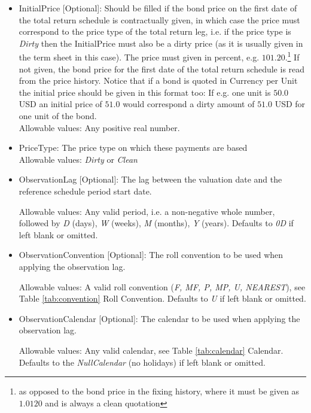 \begin{itemize}
\begin{itemize}
  \item InitialPrice [Optional]: Should be filled if the bond price on the first date of the total return schedule is
    contractually given, in which case the price must correspond to the price type of the total return leg, i.e. if the
    price type is \emph{Dirty} then the InitialPrice must also be a dirty price (as it is usually given in the term
    sheet in this case). The price must given in percent, e.g. $101.20$.\footnote{as opposed to the bond price in the
    fixing history, where it must be given as $1.0120$ and is always a clean quotation} If not given, the bond price for
    the first date of the total return schedule is read from the price history.  Notice that if a bond is quoted in
    Currency per Unit the initial price should be given in this format too: If e.g. one unit is $50.0$ USD an initial
    price of $51.0$ would correspond a dirty amount of $51.0$ USD for one unit of the bond.\\

    Allowable values: Any positive real number.

  \item PriceType: The price type on which these payments are based\\
    Allowable values: \emph{Dirty} or \emph{Clean}

  \item ObservationLag [Optional]: The lag between the valuation date and the reference schedule period start date.
  
    Allowable values: Any valid period, i.e. a non-negative whole number, followed by \emph{D} (days), \emph{W} (weeks), \emph{M} (months), \emph{Y} (years). Defaults to \emph{0D} if left blank or omitted.
    
  \item ObservationConvention [Optional]: The roll convention to be used when applying the observation lag.
  
    Allowable values: A valid roll convention (\emph{F, MF, P, MP, U, NEAREST}), see Table \ref{tab:convention} Roll Convention. Defaults to \emph{U} if left blank or omitted.
    
  \item ObservationCalendar [Optional]: The calendar to be used when applying the observation lag.
  
      Allowable values: Any valid calendar, see Table \ref{tab:calendar} Calendar. Defaults to the \emph{NullCalendar} (no holidays) if left blank or omitted.
      

\end{itemize}
\end{itemize}
